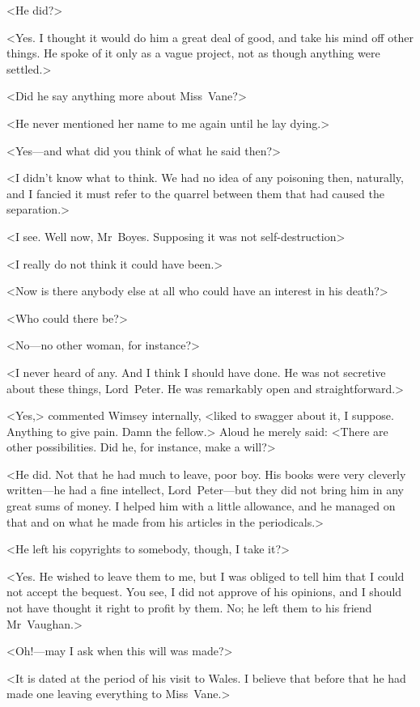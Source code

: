 <He did?>

<Yes. I thought it would do him a great deal of good, and take his mind off other things. He spoke of it only as a vague project, not as though anything were settled.>

<Did he say anything more about Miss~Vane?>

<He never mentioned her name to me again until he lay dying.>

<Yes—and what did you think of what he said then?>

<I didn't know what to think. We had no idea of any poisoning then, naturally, and I fancied it must refer to the quarrel between them that had caused the separation.>

<I see. Well now, Mr~Boyes. Supposing it was not self-destruction\longdash>

<I really do not think it could have been.>

<Now is there anybody else at all who could have an interest in his death?>

<Who could there be?>

<No—no other woman, for instance?>

<I never heard of any. And I think I should have done. He was not secretive about these things, Lord~Peter. He was remarkably open and straightforward.>

<Yes,> commented Wimsey internally, <liked to swagger about it, I suppose. Anything to give pain. Damn the fellow.> Aloud he merely said: <There are other possibilities. Did he, for instance, make a will?>

<He did. Not that he had much to leave, poor boy. His books were very cleverly written—he had a fine intellect, Lord~Peter—but they did not bring him in any great sums of money. I helped him with a little allowance, and he managed on that and on what he made from his articles in the periodicals.>

<He left his copyrights to somebody, though, I take it?>

<Yes. He wished to leave them to me, but I was obliged to tell him that I could not accept the bequest. You see, I did not approve of his opinions, and I should not have thought it right to profit by them. No; he left them to his friend Mr~Vaughan.>

<Oh!—may I ask when this will was made?>

<It is dated at the period of his visit to Wales. I believe that before that he had made one leaving everything to Miss~Vane.>

